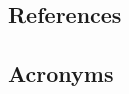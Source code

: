 \documentclass[DM,lsstdraft,STS,toc]{lsstdoc}
\begin{document}
\subsection{References\label{sect:references}}
\renewcommand{\refname}{}


\subsection{Acronyms \label{sect:acronyms}} %





\end{document}
